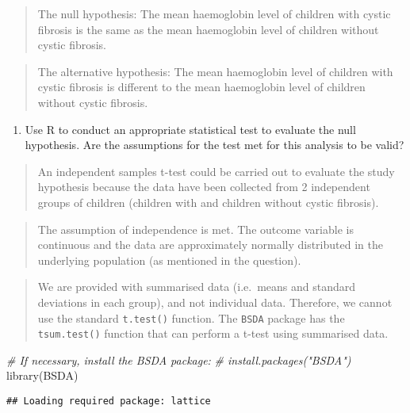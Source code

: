 \documentclass[
]{memoir}
\newenvironment{Shaded}{\begin{snugshade}}{\end{snugshade}}
\newcommand{\CommentTok}[1]{\textcolor[rgb]{0.56,0.35,0.01}{\textit{#1}}}
\newcommand{\FunctionTok}[1]{\textcolor[rgb]{0.00,0.00,0.00}{#1}}
\newcommand{\NormalTok}[1]{#1}
\providecommand{\tightlist}{%
  \setlength{\itemsep}{0pt}\setlength{\parskip}{0pt}}
\begin{document}
\begin{quote}
The null hypothesis: The mean haemoglobin level of children with cystic fibrosis is the same as the mean haemoglobin level of children without cystic fibrosis.
\end{quote}

\begin{quote}
The alternative hypothesis: The mean haemoglobin level of children with cystic fibrosis is different to the mean haemoglobin level of children without cystic fibrosis.
\end{quote}

\begin{enumerate}
\def\labelenumi{\alph{enumi})}
\setcounter{enumi}{1}
\tightlist
\item
  Use R to conduct an appropriate statistical test to evaluate the null hypothesis. Are the assumptions for the test met for this analysis to be valid?
\end{enumerate}

\begin{quote}
An independent samples t-test could be carried out to evaluate the study hypothesis because the data have been collected from 2 independent groups of children (children with and children without cystic fibrosis).
\end{quote}

\begin{quote}
The assumption of independence is met. The outcome variable is continuous and the data are approximately normally distributed in the underlying population (as mentioned in the question).
\end{quote}

\begin{quote}
We are provided with summarised data (i.e.~means and standard deviations in each group), and not individual data. Therefore, we cannot use the standard \texttt{t.test()} function. The \texttt{BSDA} package has the \texttt{tsum.test()} function that can perform a t-test using summarised data.
\end{quote}

\begin{Shaded}
\begin{Highlighting}[]
\CommentTok{\# If necessary, install the BSDA package:}
\CommentTok{\# install.packages("BSDA")}
\FunctionTok{library}\NormalTok{(BSDA)}
\end{Highlighting}
\end{Shaded}

\begin{verbatim}
## Loading required package: lattice
\end{verbatim}
\end{document}
